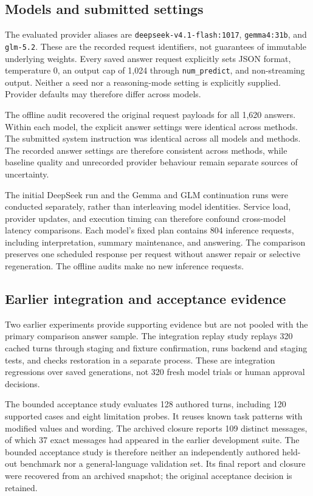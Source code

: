 \documentclass[11pt,a4paper]{article}
\begin{document}
\subsection{Models and submitted settings}
The evaluated provider aliases are \texttt{deepseek-v4.1-flash:1017}, \texttt{gemma4:31b}, and \texttt{glm-5.2}. These are the recorded request identifiers, not guarantees of immutable underlying weights. Every saved answer request explicitly sets JSON format, temperature 0, an output cap of 1,024 through \texttt{num\_predict}, and non-streaming output. Neither a seed nor a reasoning-mode setting is explicitly supplied. Provider defaults may therefore differ across models.

The offline audit recovered the original request payloads for all 1,620 answers. Within each model, the explicit answer settings were identical across methods. The submitted system instruction was identical across all models and methods. The recorded answer settings are therefore consistent across methods, while baseline quality and unrecorded provider behaviour remain separate sources of uncertainty.

The initial DeepSeek run and the Gemma and GLM continuation runs were conducted separately, rather than interleaving model identities. Service load, provider updates, and execution timing can therefore confound cross-model latency comparisons. Each model's fixed plan contains 804 inference requests, including interpretation, summary maintenance, and answering. The comparison preserves one scheduled response per request without answer repair or selective regeneration. The offline audits make no new inference requests.

\subsection{Earlier integration and acceptance evidence}
Two earlier experiments provide supporting evidence but are not pooled with the primary comparison answer sample. The integration replay study replays 320 cached turns through staging and fixture confirmation, runs backend and staging tests, and checks restoration in a separate process. These are integration regressions over saved generations, not 320 fresh model trials or human approval decisions.

The bounded acceptance study evaluates 128 authored turns, including 120 supported cases and eight limitation probes. It reuses known task patterns with modified values and wording. The archived closure reports 109 distinct messages, of which 37 exact messages had appeared in the earlier development suite. The bounded acceptance study is therefore neither an independently authored held-out benchmark nor a general-language validation set. Its final report and closure were recovered from an archived snapshot; the original acceptance decision is retained.
\end{document}
